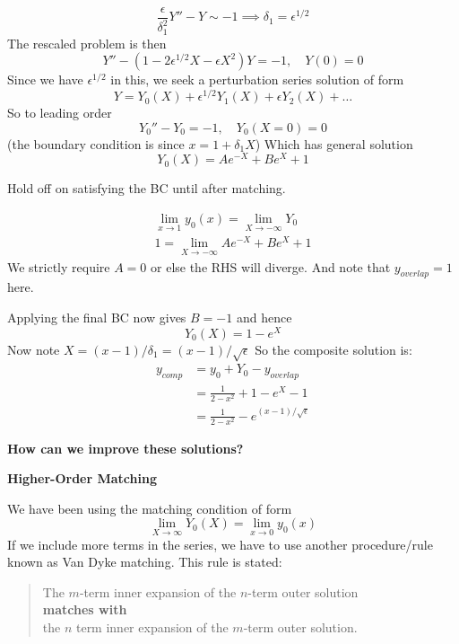 \documentclass{X:/Documents/Coding/Latex/myassignment}
\begin{document}
\[\frac{\epsilon}{\delta_1^2}  Y'' - Y \sim -1 \implies \delta_1 = \epsilon^{1/2}\]
The rescaled problem is then
\[Y'' - (1-2\epsilon^{1/2} X - \epsilon X^2) Y =-1,\quad Y(0)=0\]
Since we have $\epsilon^{1/2}$ in this, we seek a perturbation series solution of form
\[Y = Y_0(X) + \epsilon^{1/2} Y_1(X) +\epsilon Y_2(X) + \ldots\]
So to leading order
\[Y_0'' - Y_0 =-1, \quad Y_0(X =0) = 0\]
(the boundary condition is since $x = 1+ \delta_1 X$)
Which has general solution
\[Y_0(X) = Ae^{-X} + Be^{X} +1\]

Hold off on satisfying the BC until after matching.

\begin{align*}
    \lim_{x\to 1} y_0(x) = \lim_{X\to -\infty} Y_0\\
    1 = \lim_{X\to-\infty} Ae^{-X} + Be^{X} + 1
\end{align*}
We strictly require $A=0$ or else the RHS will diverge. And note that $y_{overlap} = 1$ here.


Applying the final BC now gives $B=-1$ and hence
\[Y_0(X) = 1 -e^{X}\]
Now note $X = (x-1)/\delta_1 = (x-1)/\sqrt{\epsilon}$
So the composite solution is:
\begin{align*}
    y_{comp} &= y_0 + Y_0 - y_{overlap} \\
    &= \frac{1}{2-x^2} + 1-e^X - 1\\
    &= \frac{1}{2-x^2} - e^{(x-1)/\sqrt{\epsilon}}
\end{align*}



\textbf{How can we improve these solutions?}


\textbf{Higher-Order Matching}

We have been using the matching condition of form
\[\lim_{X\to\infty} Y_0(X) = \lim_{x\to0} y_0(x)\]
If we include more terms in the series, we have to use  another procedure/rule known as Van Dyke matching. This rule is stated:

\begin{verse}
The $m$-term inner expansion of the $n$-term outer solution \\
\textbf{matches with} \\
the $n$ term inner expansion of the $m$-term outer solution.        
\end{verse}
\end{document}
